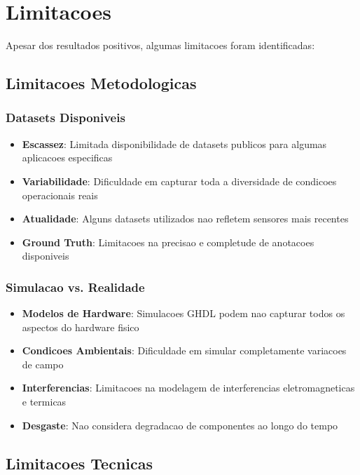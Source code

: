 \section{Limitacoes}\label{sec:limitacoes}

Apesar dos resultados positivos, algumas limitacoes foram identificadas:

\subsection{Limitacoes Metodologicas}

\subsubsection{Datasets Disponiveis}
\begin{itemize}
    \item \textbf{Escassez}: Limitada disponibilidade de datasets publicos para algumas aplicacoes especificas
    \item \textbf{Variabilidade}: Dificuldade em capturar toda a diversidade de condicoes operacionais reais
    \item \textbf{Atualidade}: Alguns datasets utilizados nao refletem sensores mais recentes
    \item \textbf{Ground Truth}: Limitacoes na precisao e completude de anotacoes disponiveis
\end{itemize}

\subsubsection{Simulacao vs. Realidade}
\begin{itemize}
    \item \textbf{Modelos de Hardware}: Simulacoes GHDL podem nao capturar todos os aspectos do hardware fisico
    \item \textbf{Condicoes Ambientais}: Dificuldade em simular completamente variacoes de campo
    \item \textbf{Interferencias}: Limitacoes na modelagem de interferencias eletromagneticas e termicas
    \item \textbf{Desgaste}: Nao considera degradacao de componentes ao longo do tempo
\end{itemize}

\subsection{Limitacoes Tecnicas}

